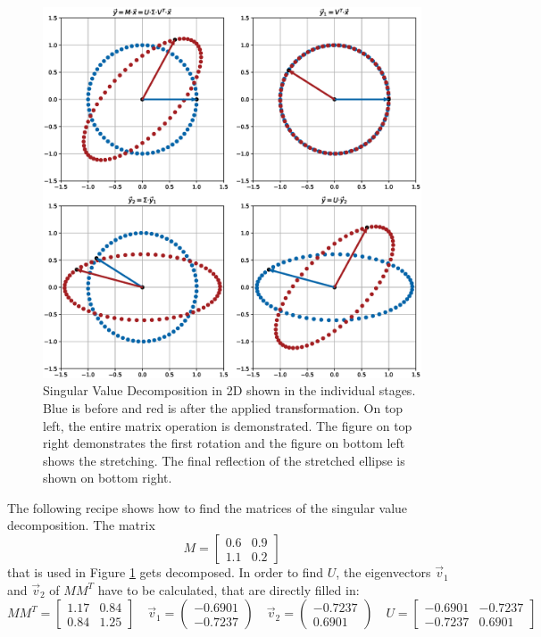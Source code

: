 \begin{figure}[h]
    \centering
    \includegraphics[width=1.0\textwidth]{images/SVD}
    \caption{Singular Value Decomposition in 2D shown in the individual stages. Blue is before and red is after the applied transformation. On top left, the entire matrix operation is demonstrated. The  figure on top right demonstrates the first rotation and the figure on bottom left shows the stretching. The final reflection of the stretched ellipse is shown on bottom right.}
    \label{im:SVD}
\end{figure}
The following recipe\cite{SVD_MIT} shows how to find the matrices of the singular value decomposition. The matrix 
\begin{equation*}
    M= 
    \begin{bmatrix}
        0.6 & 0.9  \\
        1.1 & 0.2
    \end{bmatrix}  
\end{equation*}
that is used in Figure \ref{im:SVD} gets decomposed.
In order to find $U$, the eigenvectors $\vec{v}_{1}$ and $\vec{v}_{2}$ of $MM^{T}$ have to be calculated, that are directly filled in:
\begin{equation*}
    MM^{T}= 
    \begin{bmatrix}
        1.17 & 0.84  \\
        0.84 & 1.25
    \end{bmatrix}  \quad
    \vec{v}_{1} =
    \begin{pmatrix}
        -0.6901 \\
        -0.7237
    \end{pmatrix}\quad
    \vec{v}_{2} =
    \begin{pmatrix}
        -0.7237 \\
        0.6901
    \end{pmatrix}\quad
    U= 
    \begin{bmatrix}
        -0.6901 & -0.7237  \\
        -0.7237 & 0.6901
    \end{bmatrix}
\end{equation*}
